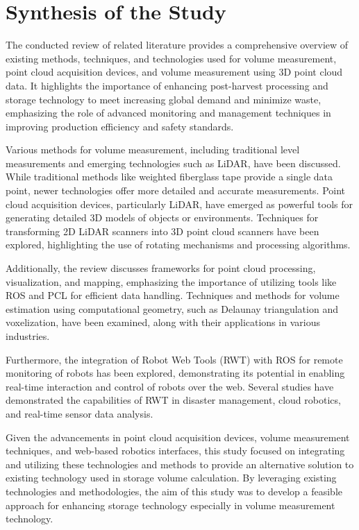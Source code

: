 
\section{Synthesis of the Study}

The conducted review of related literature provides a comprehensive overview of existing methods, techniques, and technologies used for volume measurement, point cloud acquisition devices, and volume measurement using 3D point cloud data. It highlights the importance of enhancing post-harvest processing and storage technology to meet increasing global demand and minimize waste, emphasizing the role of advanced monitoring and management techniques in improving production efficiency and safety standards.

Various methods for volume measurement, including traditional level measurements and emerging technologies such as LiDAR, have been discussed. While traditional methods like weighted fiberglass tape provide a single data point, newer technologies offer more detailed and accurate measurements. Point cloud acquisition devices, particularly LiDAR, have emerged as powerful tools for generating detailed 3D models of objects or environments. Techniques for transforming 2D LiDAR scanners into 3D point cloud scanners have been explored, highlighting the use of rotating mechanisms and processing algorithms.

Additionally, the review discusses frameworks for point cloud processing, visualization, and mapping, emphasizing the importance of utilizing tools like ROS and PCL for efficient data handling. Techniques and methods for volume estimation using computational geometry, such as Delaunay triangulation and voxelization, have been examined, along with their applications in various industries.

Furthermore, the integration of Robot Web Tools (RWT) with ROS for remote monitoring of robots has been explored, demonstrating its potential in enabling real-time interaction and control of robots over the web. Several studies have demonstrated the capabilities of RWT in disaster management, cloud robotics, and real-time sensor data analysis.

Given the advancements in point cloud acquisition devices, volume measurement techniques, and web-based robotics interfaces, this study focused on integrating and utilizing these technologies and methods to provide an alternative solution to existing technology used in storage volume calculation. By leveraging existing technologies and methodologies, the aim of this study was to develop a feasible approach for enhancing storage technology especially in volume measurement technology.